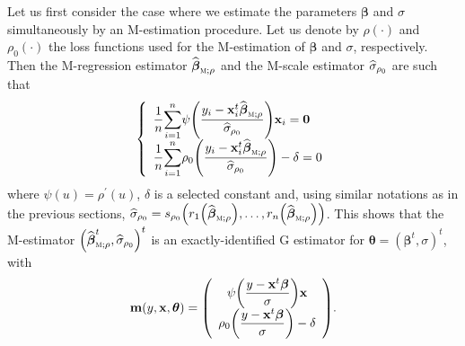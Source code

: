 Let us first consider the case where we estimate the parameters
$\boldsymbol\beta$ and $\sigma$ simultaneously by an M-estimation procedure.
Let us denote by $\rho\left(  \cdot\right)  $ and $\rho_{0}\left(
\cdot\right)  $ the loss functions used for the M-estimation of
$\boldsymbol\beta$ and $\sigma$, respectively. Then the M-regression
estimator $\sthat{\boldsymbol\beta}_{\stsc{M};\rho}$ and the M-scale
estimator $\widehat{\sigma}_{\rho_{0}}$ are such that
\begin{equation}
\left\{
\begin{array}
[c]{l}%
\dfrac{1}{n}%
{\displaystyle\sum\limits_{i=1}^{n}}
\psi\left(  \dfrac{y_{i}-\stvec{x}_{i}^{t}\sthat{\boldsymbol\beta%
}_{\stsc{M};\rho}}{\sthat{\sigma}_{\rho_{0}}}\right)  \stvec{x}%
_{i}=\stvec{0}\\
\dfrac{1}{n}%
{\displaystyle\sum\limits_{i=1}^{n}}
\rho_{0}\left(  \dfrac{y_{i}-\stvec{x}_{i}^{t}\sthat{\boldsymbol\beta%
}_{\stsc{M};\rho}}{\sthat{\sigma}_{\rho_{0}}}\right)  -\delta=0
\end{array}
\right.  \label{Eq:GMM_equations_M}%
\end{equation}
where $\psi\left(  u\right)  =\rho^{\prime}\left(  u\right)  $, $\delta$ is a
selected constant and, using similar notations as in the previous sections,
$\sthat{\sigma}_{\rho_{0}}=s_{\rho_{0}}\left(  r_{1}\left(  \widehat
{\boldsymbol\beta}_{\stsc{M};\rho}\right)  ,\ldots,r_{n}\left(
\sthat{\boldsymbol\beta}_{\stsc{M};\rho}\right)  \right)  $. This shows
that the M-estimator $\left(  \sthat{\boldsymbol\beta}_{\stsc{M};\rho
}^{t},\sthat{\sigma}_{\rho_{0}}\right)  ^{t}$ is an exactly-identified
G estimator for $\boldsymbol{\theta}=\left(  \boldsymbol\beta^{t}%
,\sigma\right)  ^{t}$, with
\begin{equation}
\mathbf{m}\left(  y,\stvec{x},\boldsymbol{\theta}\right)  =\left(
\begin{array}
[c]{c}%
\psi\left(  \dfrac{y-\stvec{x}^{t}\boldsymbol\beta}{\sigma}\right)
\stvec{x}\\
\rho_{0}\left(  \dfrac{y-\stvec{x}^{t}\boldsymbol\beta}{\sigma}\right)
-\delta
\end{array}
\right)  . \label{Eq:GMM_moment_function_M}%
\end{equation}


